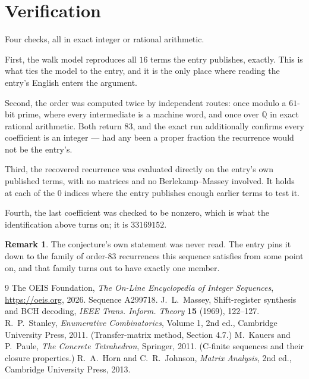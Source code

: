 \documentclass[11pt,a4paper]{article}
\theoremstyle{plain}
\theoremstyle{definition}
\newtheorem{remark}[theorem]{Remark}
\begin{document}
\section{Verification}

Four checks, all in exact integer or rational arithmetic.

First, the walk model reproduces all $16$ terms the entry publishes, exactly. This is
what ties the model to the entry, and it is the only place where reading the entry's English
enters the argument.

Second, the order was computed twice by independent routes: once modulo a $61$-bit prime, where
every intermediate is a machine word, and once over $\mathbb{Q}$ in exact rational arithmetic.
Both return $83$, and the exact run additionally confirms every coefficient is an integer
--- had any been a proper fraction the recurrence would not be the entry's.

Third, the recovered recurrence was evaluated directly on the entry's own published terms, with
no matrices and no Berlekamp--Massey involved. It holds at each of the $0$ indices where
the entry publishes enough earlier terms to test it.

Fourth, the last coefficient was checked to be nonzero, which is what the identification above
turns on; it is $33169152$.

\begin{remark}
The conjecture's own statement was never read. The entry pins it down to the family of
order-$83$ recurrences this sequence satisfies from some point on, and that family turns
out to have exactly one member.
\end{remark}

\begin{thebibliography}{9}
 The OEIS Foundation, \emph{The On-Line Encyclopedia of Integer
Sequences}, \url{https://oeis.org}, 2026. Sequence A299718.
 J.~L.~Massey, Shift-register synthesis and BCH decoding, \emph{IEEE
Trans. Inform. Theory} \textbf{15} (1969), 122--127.
 R.~P.~Stanley, \emph{Enumerative Combinatorics}, Volume 1, 2nd ed.,
Cambridge University Press, 2011. (Transfer-matrix method, Section 4.7.)
 M.~Kauers and P.~Paule, \emph{The Concrete Tetrahedron}, Springer, 2011.
(C-finite sequences and their closure properties.)
 R.~A.~Horn and C.~R.~Johnson, \emph{Matrix Analysis}, 2nd ed., Cambridge
University Press, 2013.
\end{thebibliography}
\end{document}
